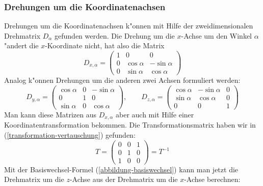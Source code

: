 \subsubsection{Drehungen um die Koordinatenachsen}
Drehungen um die Koordinatenachsen k"onnen mit Hilfe der zweidimensionalen
Drehmatrix $D_\alpha$ gefunden werden.
Die Drehung um die $x$-Achse um den
Winkel $\alpha$ "andert die $x$-Koordinate nicht, hat also die
Matrix
\[
D_{x,\alpha}=
\begin{pmatrix}
1&0&0\\
0&\cos\alpha&-\sin\alpha\\
0&\sin\alpha&\cos\alpha
\end{pmatrix}
\]
Analog k"onnen Drehungen um die anderen zwei Achsen formuliert werden:
\[
D_{y,\alpha}=\begin{pmatrix}
\cos\alpha&0&-\sin\alpha\\
0&1&0\\
\sin\alpha&0&\cos\alpha
\end{pmatrix}
,\qquad
D_{z,\alpha}=\begin{pmatrix}
\cos\alpha&-\sin\alpha&0\\
\sin\alpha&\cos\alpha&0\\
0&0&1
\end{pmatrix}
\]
Man kann diese Matrizen aus $D_{x,\alpha}$ aber auch mit Hilfe einer
Koordinatentransformation bekommen.
Die Transformationsmatrix
haben wir in (\ref{transformation-vertauschung}) gefunden:
\[
T=
\begin{pmatrix}
0&0&1\\
0&1&0\\
1&0&0
\end{pmatrix}
=T^{-1}
\]
Mit der Basiswechsel-Formel (\ref{abbildung-basiswechsel}) kann
man jetzt die Drehmatrix um die $z$-Achse aus der Drehmatrix um die
$x$-Achse berechnen:
